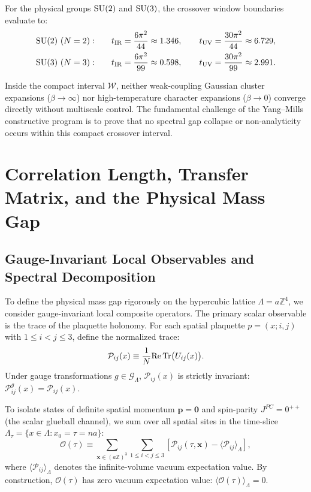 For the physical groups $\mathrm{SU}(2)$ and $\mathrm{SU}(3)$, the crossover window boundaries evaluate to:
\begin{align}
\mathrm{SU}(2) \ (N=2): \qquad & t_{\mathrm{IR}} = \frac{6\pi^2}{44} \approx 1.346, \qquad t_{\mathrm{UV}} = \frac{30\pi^2}{44} \approx 6.729, \\
\mathrm{SU}(3) \ (N=3): \qquad & t_{\mathrm{IR}} = \frac{6\pi^2}{99} \approx 0.598, \qquad t_{\mathrm{UV}} = \frac{30\pi^2}{99} \approx 2.991.
\end{align}

Inside the compact interval $\mathcal{W}$, neither weak-coupling Gaussian cluster expansions ($\beta \to \infty$) nor high-temperature character expansions ($\beta \to 0$) converge directly without multiscale control. The fundamental challenge of the Yang--Mills constructive program is to prove that no spectral gap collapse or non-analyticity occurs within this compact crossover interval.

\section{Correlation Length, Transfer Matrix, and the Physical Mass Gap}
\label{sec:correlation_length}

\subsection{Gauge-Invariant Local Observables and Spectral Decomposition}
\label{subsec:observables_spectral}

To define the physical mass gap rigorously on the hypercubic lattice $\Lambda = a \mathbb{Z}^4$, we consider gauge-invariant local composite operators. The primary scalar observable is the trace of the plaquette holonomy. For each spatial plaquette $p = (x; i, j)$ with $1 \le i < j \le 3$, define the normalized trace:
\begin{equation}
\label{eq:scalar_plaquette_obs}
\mathcal{P}_{ij}(x) \equiv \frac{1}{N} \mathrm{Re} \, \mathrm{Tr}\bigl( U_{ij}(x) \bigr).
\end{equation}
Under gauge transformations $g \in \mathcal{G}_\Lambda$, $\mathcal{P}_{ij}(x)$ is strictly invariant: $\mathcal{P}_{ij}^g(x) = \mathcal{P}_{ij}(x)$. 

To isolate states of definite spatial momentum $\mathbf{p} = \mathbf{0}$ and spin-parity $J^{PC} = 0^{++}$ (the scalar glueball channel), we sum over all spatial sites in the time-slice $\Lambda_\tau = \{x \in \Lambda : x_0 = \tau = n a\}$:
\begin{equation}
\label{eq:zero_momentum_glueball}
\mathcal{O}(\tau) \equiv \sum_{\mathbf{x} \in (a\mathbb{Z})^3} \sum_{1 \le i < j \le 3} \left[ \mathcal{P}_{ij}(\tau, \mathbf{x}) - \langle \mathcal{P}_{ij} \rangle_\Lambda \right],
\end{equation}
where $\langle \mathcal{P}_{ij} \rangle_\Lambda$ denotes the infinite-volume vacuum expectation value. By construction, $\mathcal{O}(\tau)$ has zero vacuum expectation value: $\langle \mathcal{O}(\tau) \rangle_\Lambda = 0$.

